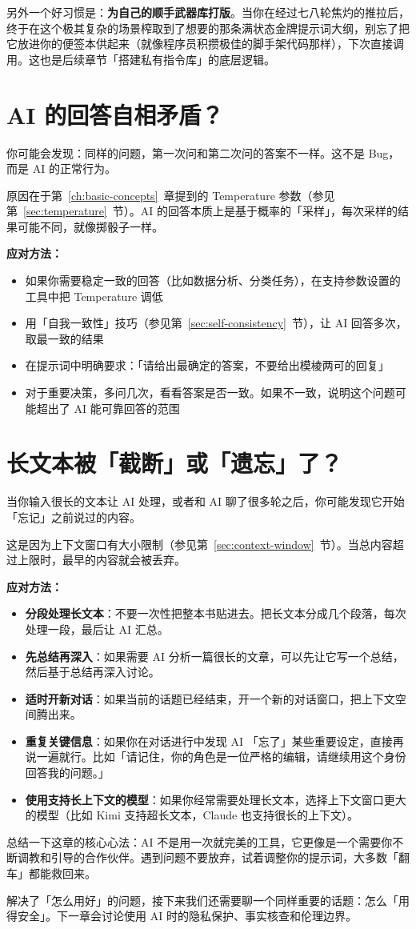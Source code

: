 另外一个好习惯是：\textbf{为自己的顺手武器库打版}。当你在经过七八轮焦灼的推拉后，终于在这个极其复杂的场景榨取到了想要的那条满状态金牌提示词大纲，别忘了把它放进你的便签本供起来（就像程序员积攒极佳的脚手架代码那样），下次直接调用。这也是后续章节「搭建私有指令库」的底层逻辑。

\section{AI 的回答自相矛盾？}

你可能会发现：同样的问题，第一次问和第二次问的答案不一样。这不是 Bug，而是 AI 的正常行为。

原因在于第~\ref{ch:basic-concepts}~章提到的 Temperature 参数（参见第~\ref{sec:temperature}~节）。AI 的回答本质上是基于概率的「采样」，每次采样的结果可能不同，就像掷骰子一样。

\textbf{应对方法：}

\begin{itemize}
  \item 如果你需要稳定一致的回答（比如数据分析、分类任务），在支持参数设置的工具中把 Temperature 调低
  \item 用「自我一致性」技巧（参见第~\ref{sec:self-consistency}~节），让 AI 回答多次，取最一致的结果
  \item 在提示词中明确要求：「请给出最确定的答案，不要给出模棱两可的回复」
  \item 对于重要决策，多问几次，看看答案是否一致。如果不一致，说明这个问题可能超出了 AI 能可靠回答的范围
\end{itemize}

\section{长文本被「截断」或「遗忘」了？}

当你输入很长的文本让 AI 处理，或者和 AI 聊了很多轮之后，你可能发现它开始「忘记」之前说过的内容。

这是因为上下文窗口有大小限制（参见第~\ref{sec:context-window}~节）。当总内容超过上限时，最早的内容就会被丢弃。

\textbf{应对方法：}

\begin{itemize}
  \item \textbf{分段处理长文本}：不要一次性把整本书贴进去。把长文本分成几个段落，每次处理一段，最后让 AI 汇总。
  \item \textbf{先总结再深入}：如果需要 AI 分析一篇很长的文章，可以先让它写一个总结，然后基于总结再深入讨论。
  \item \textbf{适时开新对话}：如果当前的话题已经结束，开一个新的对话窗口，把上下文空间腾出来。
  \item \textbf{重复关键信息}：如果你在对话进行中发现 AI 「忘了」某些重要设定，直接再说一遍就行。比如「请记住，你的角色是一位严格的编辑，请继续用这个身份回答我的问题。」
  \item \textbf{使用支持长上下文的模型}：如果你经常需要处理长文本，选择上下文窗口更大的模型（比如 Kimi 支持超长文本，Claude 也支持很长的上下文）。
\end{itemize}

总结一下这章的核心心法：AI 不是用一次就完美的工具，它更像是一个需要你不断调教和引导的合作伙伴。遇到问题不要放弃，试着调整你的提示词，大多数「翻车」都能救回来。

解决了「怎么用好」的问题，接下来我们还需要聊一个同样重要的话题：怎么「用得安全」。下一章会讨论使用 AI 时的隐私保护、事实核查和伦理边界。
